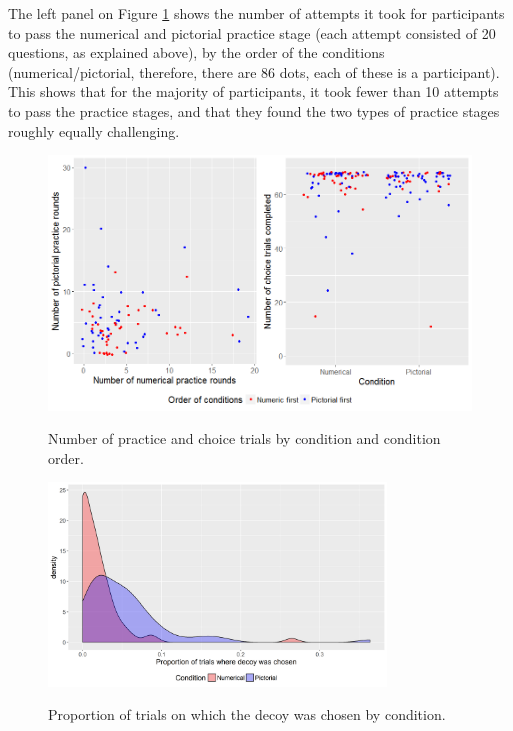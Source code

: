 \documentclass[11pt,a4paper]{article}
\begin{document}
The left panel on Figure \ref{fig:Explor_teapot} shows the number of attempts it took for participants to pass the numerical and pictorial practice stage (each attempt consisted of 20 questions, as explained above), by the order of the conditions (numerical/pictorial, therefore, there are 86 dots, each of these is a participant). This shows that for the majority of participants, it took fewer than 10 attempts to pass the practice stages, and that they found the two types of practice stages roughly equally challenging. 


\begin{figure}[ht]
\centering
\caption{Number of practice and choice trials by condition and condition order.}
\includegraphics[width=1\textwidth]{Explor_teapot.png}
\label{fig:Explor_teapot}
\end{figure}


\begin{figure}
\centering
\caption{Proportion of trials on which the decoy was chosen by condition.}
\includegraphics[width=0.8\textwidth]{Explor_teapot_dec.png}
\label{fig:Explor_teapot_dec}
\end{figure}
\end{document}
